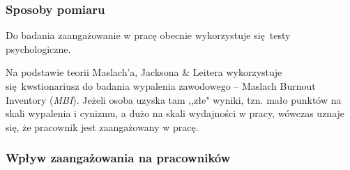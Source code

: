 \subsubsection{Sposoby pomiaru}
Do badania zaangażowanie w pracę obecnie wykorzystuje się testy psychologiczne.

Na podstawie teorii Maslach'a, Jacksona \& Leitera wykorzystuje się kwstionariusz do badania wypalenia zawodowego -- Maslach Burnout Inventory (\emph{MBI}). Jeżeli osoba uzyska tam ,,złe" wyniki, tzn. mało punktów na skali wypalenia i cynizmu, a dużo na skali wydajności w pracy, wówczas uznaje się, że pracownik jest zaangażowany w pracę.

\subsubsection{Wpływ zaangażowania na pracowników}
